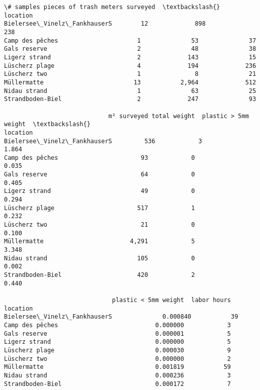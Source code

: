 \documentclass[11pt]{article}
\begin{document}
            \begin{tcolorbox}[breakable, size=fbox, boxrule=.5pt, pad at break*=1mm, opacityfill=0]
\begin{Verbatim}[commandchars=\\\{\}]
                             \# samples pieces of trash meters surveyed  \textbackslash{}
location
Bielersee\_Vinelz\_FankhauserS        12             898             238
Camp des pêches                      1              53              37
Gals reserve                         2              48              38
Ligerz strand                        2             143              15
Lüscherz plage                       4             194             236
Lüscherz two                         1               8              21
Müllermatte                         13           2,964             512
Nidau strand                         1              63              25
Strandboden-Biel                     2             247              93

                             m² surveyed total weight  plastic > 5mm weight  \textbackslash{}
location
Bielersee\_Vinelz\_FankhauserS         536            3                 1.864
Camp des pêches                       93            0                 0.035
Gals reserve                          64            0                 0.405
Ligerz strand                         49            0                 0.294
Lüscherz plage                       517            1                 0.232
Lüscherz two                          21            0                 0.100
Müllermatte                        4,291            5                 3.348
Nidau strand                         105            0                 0.002
Strandboden-Biel                     420            2                 0.440

                              plastic < 5mm weight  labor hours
location
Bielersee\_Vinelz\_FankhauserS              0.000840           39
Camp des pêches                           0.000000            3
Gals reserve                              0.000001            5
Ligerz strand                             0.000000            5
Lüscherz plage                            0.000030            9
Lüscherz two                              0.000000            2
Müllermatte                               0.001819           59
Nidau strand                              0.000236            3
Strandboden-Biel                          0.000172            7
\end{Verbatim}
\end{tcolorbox}
        
\end{document}
